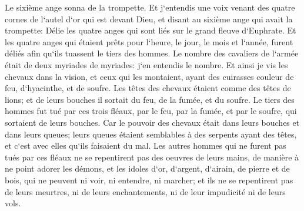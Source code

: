 \verse Le sixième ange sonna de la trompette. Et j`entendis une voix venant des quatre cornes de l`autel d`or qui est devant Dieu, 
\verse et disant au sixième ange qui avait la trompette: Délie les quatre anges qui sont liés sur le grand fleuve d`Euphrate. 
\verse Et les quatre anges qui étaient prêts pour l`heure, le jour, le mois et l`année, furent déliés afin qu`ils tuassent le tiers des hommes. 
\verse Le nombre des cavaliers de l`armée était de deux myriades de myriades: j`en entendis le nombre. 
\verse Et ainsi je vis les chevaux dans la vision, et ceux qui les montaient, ayant des cuirasses couleur de feu, d`hyacinthe, et de soufre. Les têtes des chevaux étaient comme des têtes de lions; et de leurs bouches il sortait du feu, de la fumée, et du soufre. 
\verse Le tiers des hommes fut tué par ces trois fléaux, par le feu, par la fumée, et par le soufre, qui sortaient de leurs bouches. 
\verse Car le pouvoir des chevaux était dans leurs bouches et dans leurs queues; leurs queues étaient semblables à des serpents ayant des têtes, et c`est avec elles qu`ils faisaient du mal. 
\verse Les autres hommes qui ne furent pas tués par ces fléaux ne se repentirent pas des oeuvres de leurs mains, de manière à ne point adorer les démons, et les idoles d`or, d`argent, d`airain, de pierre et de bois, qui ne peuvent ni voir, ni entendre, ni marcher; 
\verse et ils ne se repentirent pas de leurs meurtres, ni de leurs enchantements, ni de leur impudicité ni de leurs vols. 

